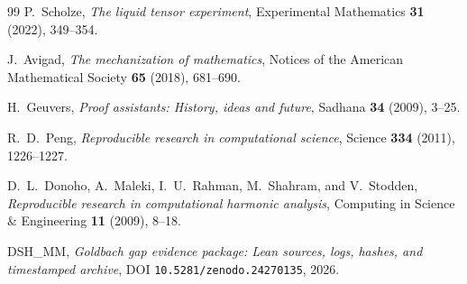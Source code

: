 \documentclass[11pt,a4paper]{ctexart}
\theoremstyle{plain}
\theoremstyle{definition}
\begin{document}
\begin{thebibliography}{99}
P.~Scholze,
\emph{The liquid tensor experiment},
Experimental Mathematics \textbf{31} (2022), 349--354.

J.~Avigad,
\emph{The mechanization of mathematics},
Notices of the American Mathematical Society \textbf{65} (2018), 681--690.

H.~Geuvers,
\emph{Proof assistants: History, ideas and future},
Sadhana \textbf{34} (2009), 3--25.

R.~D.~Peng,
\emph{Reproducible research in computational science},
Science \textbf{334} (2011), 1226--1227.

D.~L.~Donoho, A.~Maleki, I.~U.~Rahman, M.~Shahram, and V.~Stodden,
\emph{Reproducible research in computational harmonic analysis},
Computing in Science \& Engineering \textbf{11} (2009), 8--18.

DSH\_MM,
\emph{Goldbach gap evidence package: Lean sources, logs, hashes, and timestamped archive},
DOI \texttt{10.5281/zenodo.24270135}, 2026.

\end{thebibliography}
\end{document}
